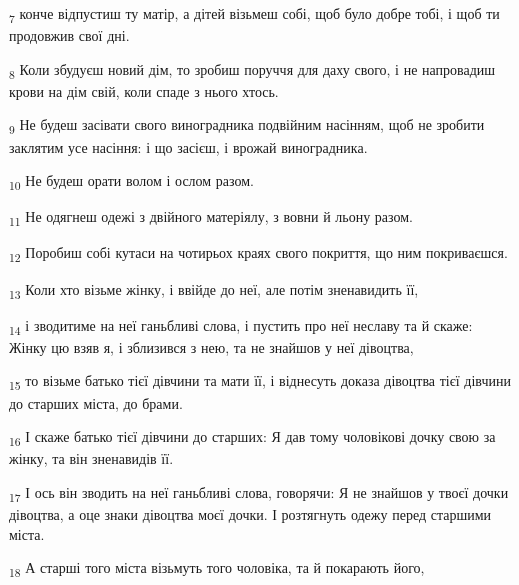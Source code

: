 \begin{tcolorbox}
\textsubscript{7} конче відпустиш ту матір, а дітей візьмеш собі, щоб було добре тобі, і щоб ти продовжив свої дні.
\end{tcolorbox}
\begin{tcolorbox}
\textsubscript{8} Коли збудуєш новий дім, то зробиш поруччя для даху свого, і не напровадиш крови на дім свій, коли спаде з нього хтось.
\end{tcolorbox}
\begin{tcolorbox}
\textsubscript{9} Не будеш засівати свого виноградника подвійним насінням, щоб не зробити заклятим усе насіння: і що засієш, і врожай виноградника.
\end{tcolorbox}
\begin{tcolorbox}
\textsubscript{10} Не будеш орати волом і ослом разом.
\end{tcolorbox}
\begin{tcolorbox}
\textsubscript{11} Не одягнеш одежі з двійного матеріялу, з вовни й льону разом.
\end{tcolorbox}
\begin{tcolorbox}
\textsubscript{12} Поробиш собі кутаси на чотирьох краях свого покриття, що ним покриваєшся.
\end{tcolorbox}
\begin{tcolorbox}
\textsubscript{13} Коли хто візьме жінку, і ввійде до неї, але потім зненавидить її,
\end{tcolorbox}
\begin{tcolorbox}
\textsubscript{14} і зводитиме на неї ганьбливі слова, і пустить про неї неславу та й скаже: Жінку цю взяв я, і зблизився з нею, та не знайшов у неї дівоцтва,
\end{tcolorbox}
\begin{tcolorbox}
\textsubscript{15} то візьме батько тієї дівчини та мати її, і віднесуть доказа дівоцтва тієї дівчини до старших міста, до брами.
\end{tcolorbox}
\begin{tcolorbox}
\textsubscript{16} І скаже батько тієї дівчини до старших: Я дав тому чоловікові дочку свою за жінку, та він зненавидів її.
\end{tcolorbox}
\begin{tcolorbox}
\textsubscript{17} І ось він зводить на неї ганьбливі слова, говорячи: Я не знайшов у твоєї дочки дівоцтва, а оце знаки дівоцтва моєї дочки. І розтягнуть одежу перед старшими міста.
\end{tcolorbox}
\begin{tcolorbox}
\textsubscript{18} А старші того міста візьмуть того чоловіка, та й покарають його,
\end{tcolorbox}
